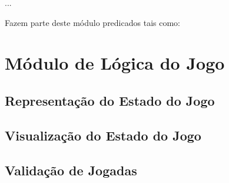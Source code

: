 \documentclass[15pt,a4paper]{article}
\begin{document}
\begin{code}[H]
	\begin{verbatimtab} %


...
\end{verbatimtab}
\caption{Fazem parte deste módulo predicados tais como:}
\end{code}


\newpage

\section{Módulo de Lógica do Jogo}




\subsection{Representação do Estado do Jogo}




\subsection{Visualização do Estado do Jogo}




\subsection{Validação de Jogadas}


\end{document}
